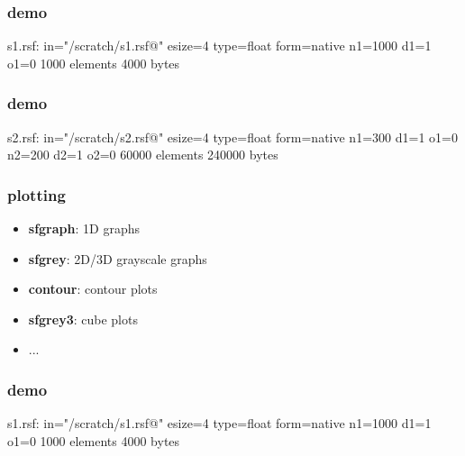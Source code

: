\begin{frame}[fragile] \frametitle{demo}


  \vfill

\tiny
\begin{semiverbatim}
s1.rsf:
    in="/scratch/s1.rsf@"
    esize=4 type=float form=native
    n1=1000        d1=1           o1=0
        1000 elements 4000 bytes
\end{semiverbatim}
\large

\end{frame}
\cwpnote{}

\begin{frame}[fragile] \frametitle{demo}


  \vfill

\tiny
\begin{semiverbatim}
s2.rsf:
    in="/scratch/s2.rsf@"
    esize=4 type=float form=native
    n1=300         d1=1           o1=0
    n2=200         d2=1           o2=0
        60000 elements 240000 bytes
\end{semiverbatim}
\large

\end{frame}
\cwpnote{}

\begin{frame} \frametitle{plotting}

\begin{itemize}
   \item {\bf sfgraph}: 1D graphs
   \item {\bf sfgrey}: 2D/3D grayscale graphs
   \item {\bf contour}: contour plots
   \item {\bf sfgrey3}: cube plots
   \item ...
\end{itemize}

\end{frame}
\cwpnote{}

\begin{frame}[fragile] \frametitle{demo}


\tiny
\begin{semiverbatim}
s1.rsf:
    in="/scratch/s1.rsf@"
    esize=4 type=float form=native
    n1=1000        d1=1           o1=0
        1000 elements 4000 bytes
\end{semiverbatim}
\large

  \vfill


\end{frame}
\cwpnote{}

